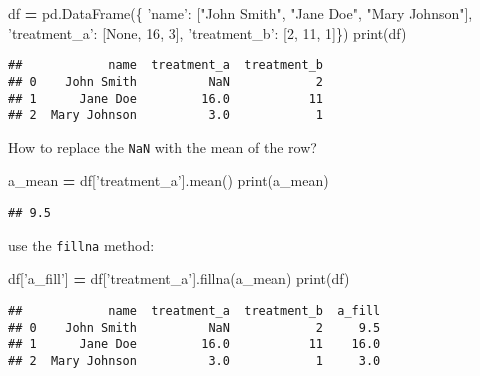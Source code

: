 \documentclass[]{book}
\newenvironment{Shaded}{\begin{snugshade}}{\end{snugshade}}
\newcommand{\BuiltInTok}[1]{#1}
\newcommand{\DecValTok}[1]{\textcolor[rgb]{0.00,0.00,0.81}{#1}}
\newcommand{\NormalTok}[1]{#1}
\newcommand{\OperatorTok}[1]{\textcolor[rgb]{0.81,0.36,0.00}{\textbf{#1}}}
\newcommand{\StringTok}[1]{\textcolor[rgb]{0.31,0.60,0.02}{#1}}
\newcommand{\VariableTok}[1]{\textcolor[rgb]{0.00,0.00,0.00}{#1}}
\theoremstyle{definition}
\theoremstyle{definition}
\theoremstyle{definition}
\theoremstyle{remark}
\begin{document}
\begin{Shaded}
\begin{Highlighting}[]
\NormalTok{df }\OperatorTok{=}\NormalTok{ pd.DataFrame(\{}
            \StringTok{'name'}\NormalTok{: [}\StringTok{"John Smith"}\NormalTok{, }\StringTok{"Jane Doe"}\NormalTok{, }\StringTok{"Mary Johnson"}\NormalTok{],}
            \StringTok{'treatment_a'}\NormalTok{: [}\VariableTok{None}\NormalTok{, }\DecValTok{16}\NormalTok{, }\DecValTok{3}\NormalTok{], }
            \StringTok{'treatment_b'}\NormalTok{: [}\DecValTok{2}\NormalTok{, }\DecValTok{11}\NormalTok{, }\DecValTok{1}\NormalTok{]\})}
\BuiltInTok{print}\NormalTok{(df)}
\end{Highlighting}
\end{Shaded}

\begin{verbatim}
##            name  treatment_a  treatment_b
## 0    John Smith          NaN            2
## 1      Jane Doe         16.0           11
## 2  Mary Johnson          3.0            1
\end{verbatim}

How to replace the \texttt{NaN} with the mean of the row?

\begin{Shaded}
\begin{Highlighting}[]
\NormalTok{a_mean }\OperatorTok{=}\NormalTok{ df[}\StringTok{'treatment_a'}\NormalTok{].mean()}
\BuiltInTok{print}\NormalTok{(a_mean)}
\end{Highlighting}
\end{Shaded}

\begin{verbatim}
## 9.5
\end{verbatim}

use the \texttt{fillna} method:

\begin{Shaded}
\begin{Highlighting}[]
\NormalTok{df[}\StringTok{'a_fill'}\NormalTok{] }\OperatorTok{=}\NormalTok{ df[}\StringTok{'treatment_a'}\NormalTok{].fillna(a_mean)}
\BuiltInTok{print}\NormalTok{(df)}
\end{Highlighting}
\end{Shaded}

\begin{verbatim}
##            name  treatment_a  treatment_b  a_fill
## 0    John Smith          NaN            2     9.5
## 1      Jane Doe         16.0           11    16.0
## 2  Mary Johnson          3.0            1     3.0
\end{verbatim}
\end{document}
